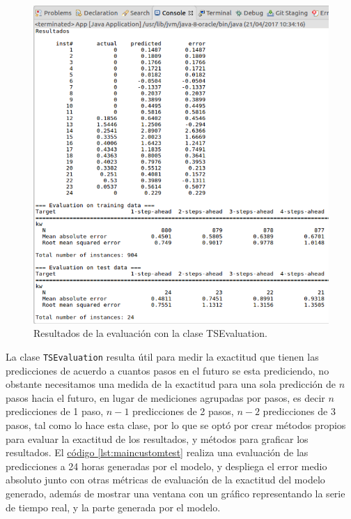 \begin{figure}[h]
	\centering
	\includegraphics[width=15cm]{img/resultadosEvaluacion.png}
	\caption{Resultados de la evaluación con la clase TSEvaluation. }
	\label{fig:resultadosEvaluacion}
\end{figure}
\clearpage
La clase \texttt{TSEvaluation} resulta útil para medir la exactitud que tienen las predicciones de acuerdo a cuantos pasos en el futuro se esta prediciendo, no obstante necesitamos una medida de la exactitud para una sola predicción de $n$ pasos hacia el futuro, en lugar de mediciones agrupadas por pasos, es decir $n$ predicciones de 1 paso, $n-1$ predicciones de 2 pasos, $n-2$ predicciones de 3 pasos, tal como lo hace esta clase, por lo que se optó por crear métodos propios para evaluar la exactitud de los resultados, y métodos para graficar los resultados.
El \hyperref[lst:maincustomtest]{código \ref{lst:maincustomtest}} realiza una evaluación de las predicciones a 24 horas generadas por el modelo, y despliega el error medio absoluto junto con otras métricas de evaluación de la exactitud del modelo generado, además de mostrar una ventana con un gráfico representando la serie de tiempo real, y la parte generada por el modelo.



